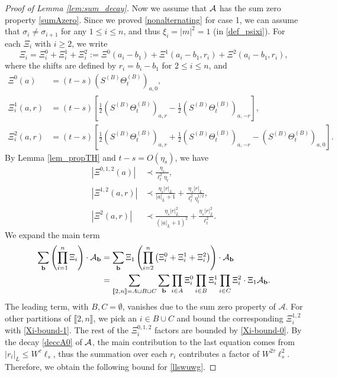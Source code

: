 \begin{proof}[Proof of Lemma \ref{lem:sum_decay}]
Now we assume that $\cal A$ has the sum zero property \eqref{sumAzero}. Since we proved \eqref{nonalternating} for case 1,  we can assume that $\sigma_i\ne \sigma_{i+1}$ for any $1\le i\le n$, and thus $\xi_i=|m|^2=1$ (in \eqref{def_psixi}). For each $\Xi_i$ with $i\ge 2$,  we write 
$$
\Xi_i=\Xi^0_i+\Xi^1_i+\Xi^2_i:=\Xi^0(a_i-b_1) + \Xi^1(a_i-b_1,r_i) + \Xi^2(a_i-b_1,r_i),
$$ 
where the shifts are defined by $r_i = b_i - b_1$ for $2\le i\le n$, and
\begin{align*}
    \Xi^0(a) &= (t-s)\left(S^{(B)}\Theta^{(B)}_t\right)_{a, 0  },\\
    \Xi_i^1(a, r) &= (t-s)\left[\frac12\left(S^{(B)}\Theta^{(B)}_t\right)_{a, r} - \frac12\left(S^{(B)}\Theta^{(B)}_t\right)_{a, -r}\right],\\
    \Xi_i^2(a, r) &= (t-s)\left[\frac12\left(S^{(B)}\Theta^{(B)}_t\right)_{a, r} + \frac12\left(S^{(B)}\Theta^{(B)}_t\right)_{a, -r} - \left(S^{(B)}\Theta^{(B)}_t\right)_{a, 0}\right].
\end{align*}
By Lemma \ref{lem_propTH} and $t-s = O(\eta_s)$, we have 
\begin{align}
    \left|\Xi^{0,1,2}(a)\right| &\prec \frac{\eta_s}{\ell_t^2\eta_t},\label{Xi-bound-0}\\
    \left|\Xi^{1,2}(a, r)\right| &\prec \frac{\eta_s|r|_L}{|a|_L+1}+\frac{\eta_{s}|r|_{L}}{\ell_{t}^{2}\eta_{t}^{1/2}},\label{Xi-bound-1}\\
    \left|\Xi^2(a, r)\right| &\prec \frac{\eta_s|r|_L^2}{(|a|_L+1)^2}+\frac{\eta_{s}|r|_{L}^{2}}{\ell_{t}^{2}}.\label{Xi-bound-2}
\end{align}
We expand the main term
\begin{align}
\sum_{\textbf{b}}   \left(\prod_{i=1}^n  \Xi_i\right)  \cdot 
{\cal A}_{\textbf{b}}&=\sum_{\textbf{b}} \Xi_1
\left(\prod_{i=2}^n  \left(\Xi^0_i+  \Xi^1_i + \Xi^2_i\right)\right)\cdot
{\cal A}_{\textbf{b}}\nonumber\\
&= \sum_{\llbracket2,n\rrbracket = A\sqcup B\sqcup C} \sum_{\textbf{b}}\prod_{i\in A} \Xi_i^0 \prod_{i\in B} \Xi_i^1 \prod_{i\in C} \Xi_i^2 \cdot \Xi_1 \mathcal{A}_{\textbf{b}}.\label{Xi-expansion}
\end{align}
The leading term, with $B, C =\emptyset$, vanishes due to the sum zero property of $\mathcal{A}$. For other partitions of $\llbracket 2,n\rrbracket$, we pick an $i\in B\cup C$ and bound the corresponding $\Xi^{1,2}_i$ with \eqref{Xi-bound-1}. The rest of the $\Xi^{0,1,2}_i$ factors are bounded by \eqref{Xi-bound-0}. By the decay \eqref{deccA0} of $\cal A$,  the main contribution to the last equation comes from $|r_i|_L\le W^\tau \ell_s$, thus the summation over each $r_i$ contributes a factor of $W^{2\tau}\ell_s^2$. Therefore, we obtain the following bound for  \eqref{llswuwg}.

\end{proof}
